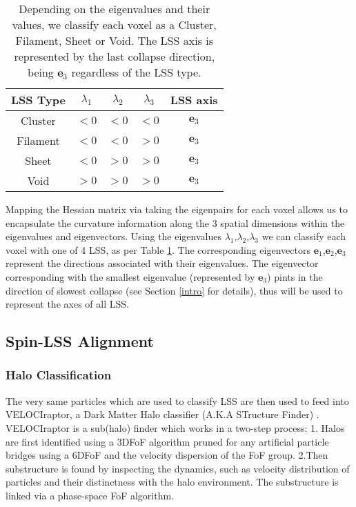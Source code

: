 \documentclass[a4paper,fleqn,usenatbib]{mnras}
\begin{document}
\begin{table}
\centering
\begin{tabular}{|c|c|c|c|c|}
	\hline
	LSS Type & $\lambda_{1}$ & $\lambda_{2}$ & $\lambda_{3}$ & LSS axis\\
	\hline
    Cluster & $<0$ & $<0$ & $<0$ & $\textbf{e}_{3}$\\
	\hline
    Filament & $<0$ & $<0$ & $>0$ & $\textbf{e}_{3}$\\
	\hline
    Sheet & $<0$ & $>0$ & $>0$ & $\textbf{e}_{3}$\\
	\hline
    Void & $>0$ & $>0$ & $>0$ & $\textbf{e}_{3}$\\
	\hline   
    
\end{tabular}
\caption{\label{eigpairs}Depending on the eigenvalues and their values, we classify each voxel as a Cluster, Filament, Sheet or Void. The LSS axis is represented by the last collapse direction, being $\textbf{e}_{3}$ regardless of the LSS type.}
\end{table}

Mapping the Hessian matrix via taking the eigenpairs for each voxel allows us to encapsulate the curvature information along the 3 spatial dimensions within the eigenvalues and eigenvectors.
Using the eigenvalues $\lambda_{1}$,$\lambda_{2}$,$\lambda_{3}$ we can classify each voxel with one of 4 LSS, as per Table \ref{eigpairs}. The corresponding eigenvectors $\textbf{e}_{1}$,$\textbf{e}_{2}$,$\textbf{e}_{3}$ represent the directions associated with their eigenvalues. The eigenvector corresponding with the smallest eigenvalue (represented by $\textbf{e}_{3}$)  pints in the direction of slowest collapse (see Section \ref{intro} for details), thus will be used to represent the axes of all LSS.

\subsection{Spin-LSS Alignment}\label{alignment}

\subsubsection{Halo Classification}\label{halo_spin}
The very same particles which are used to classify LSS are then used to feed into VELOCIraptor, a Dark Matter Halo classifier (A.K.A STructure Finder) \citep{Elahi_11}. VELOCIraptor is a sub(halo) finder which works in a two-step process:
1. Halos are first identified using a  3DFoF algorithm pruned for any artificial particle bridges using a 6DFoF and the velocity dispersion of the FoF group.
2.Then substructure is found by inspecting the dynamics, such as velocity distribution of particles and their distinctness with the halo environment. The substructure is linked via a phase-space FoF algorithm. 
\end{document}
